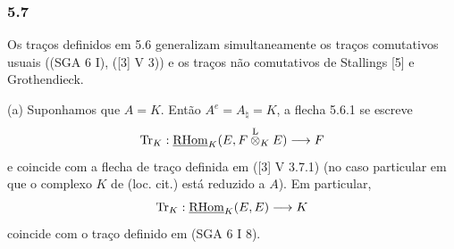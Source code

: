\subsubsection*{5.7}

Os traços definidos em 5.6 generalizam simultaneamente os traços comutativos usuais ((SGA 6 I), ([3] V 3)) e os traços não comutativos de Stallings [5] e Grothendieck.

(a) Suponhamos que $A=K$. Então $A^e=A_\natural=K$, a flecha 5.6.1 se escreve
\[
\operatorname{Tr}_K:\underline{\mathrm{RHom}}_K(E,F\overset{\mathrm L}{\otimes}_KE)\longrightarrow F
\]
e coincide com a flecha de traço definida em ([3] V 3.7.1) (no caso particular em que o complexo $K$ de (loc. cit.) está reduzido a $A$). Em particular,
\[
\operatorname{Tr}_K:\underline{\mathrm{RHom}}_K(E,E)\longrightarrow K
\]
coincide com o traço definido em (SGA 6 I 8).

